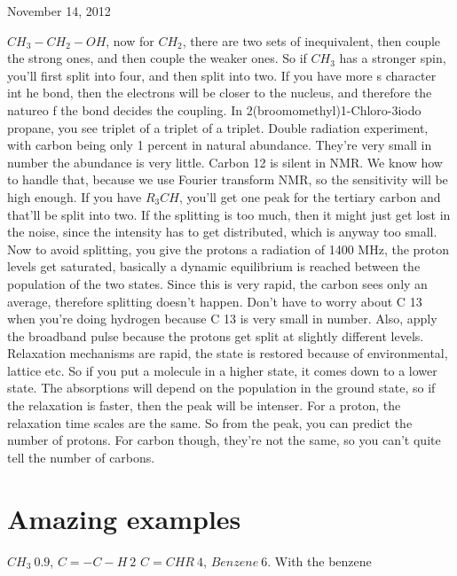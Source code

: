 \begin{flushright}
November 14, 2012
\end{flushright}
		$CH_3-CH_2-OH$, now for $CH_2$, there are two sets of inequivalent, then couple the strong ones, and then couple the weaker ones. So if $CH_3$ has a stronger spin, you'll first split into four, and then split into two.
		If you have more s character int he bond, then the electrons will be closer to the nucleus, and therefore the natureo f the bond decides the coupling.		
		In 2(broomomethyl)1-Chloro-3iodo propane, you see triplet of a triplet of a triplet.
		Double radiation experiment, with carbon being only 1 percent in natural abundance. They're very small in number the abundance is very little. Carbon 12 is silent in NMR. We know how to handle that, because we use Fourier transform NMR, so the sensitivity will be high enough. If you have $R_3CH$, you'll get one peak for the tertiary carbon and that'll be split into two. If the splitting is too much, then it might just get lost in the noise, since the intensity has to get distributed, which is anyway too small. Now to avoid splitting, you give the protons a radiation of 1400 MHz, the proton levels get saturated, basically a dynamic equilibrium is reached between the population of the two states. Since this is very rapid, the carbon sees only an average, therefore splitting doesn't happen.  Don't have to worry about C 13 when you're doing hydrogen because C 13 is very small in number. Also, apply the broadband pulse because the protons get split at slightly different levels.
		Relaxation mechanisms are rapid, the state is restored because of environmental, lattice etc. So if you put a molecule in a higher state, it comes down to a lower state. The absorptions will depend on the population in the ground state, so if the relaxation is faster, then the peak will be intenser. For a proton, the relaxation time scales are the same. So from the peak, you can predict the number of protons. For carbon though, they're not the same, so you can't quite tell the number of carbons.
\section{Amazing examples}
		$CH_3 ~ 0.9$, $C=-C-H ~ 2$ $C=CHR ~ 4$, $Benzene ~ 6$. With the benzene

